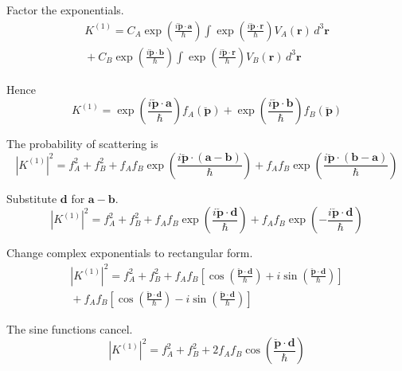 Factor the exponentials.
\begin{multline*}
K^{(1)}
=C_A\exp\left(\frac{i\breve{\mathbf p}\cdot\mathbf a}{\hbar}\right)
\int\exp\left(\frac{i\breve{\mathbf p}\cdot\mathbf r}{\hbar}\right)
V_A(\mathbf r)\,d^3\mathbf r
\\
{}+C_B\exp\left(\frac{i\breve{\mathbf p}\cdot\mathbf b}{\hbar}\right)
\int\exp\left(\frac{i\breve{\mathbf p}\cdot\mathbf r}{\hbar}\right)
V_B(\mathbf r)\,d^3\mathbf r
\end{multline*}

Hence
\begin{equation*}
K^{(1)}=\exp\left(\frac{i\breve{\mathbf p}\cdot\mathbf a}{\hbar}\right)f_A(\breve{\mathbf p})
+\exp\left(\frac{i\breve{\mathbf p}\cdot\mathbf b}{\hbar}\right)f_B(\breve{\mathbf p})
\end{equation*}

The probability of scattering is
\begin{equation*}
\left|K^{(1)}\right|^2=f_A^2+f_B^2
+f_Af_B\exp\left(\frac{i\breve{\mathbf p}\cdot(\mathbf a-\mathbf b)}{\hbar}\right)
+f_Af_B\exp\left(\frac{i\breve{\mathbf p}\cdot(\mathbf b-\mathbf a)}{\hbar}\right)
\end{equation*}

Substitute $\mathbf d$ for $\mathbf a-\mathbf b$.
\begin{equation*}
\left|K^{(1)}\right|^2=f_A^2+f_B^2
+f_Af_B\exp\left(\frac{i\breve{\mathbf p}\cdot\mathbf d}{\hbar}\right)
+f_Af_B\exp\left(-\frac{i\breve{\mathbf p}\cdot\mathbf d}{\hbar}\right)
\end{equation*}

Change complex exponentials to rectangular form.
\begin{multline*}
\left|K^{(1)}\right|^2=f_A^2+f_B^2
+f_Af_B\left[\cos\left(\frac{\breve{\mathbf p}\cdot\mathbf d}{\hbar}\right)
+i\sin\left(\frac{\breve{\mathbf p}\cdot\mathbf d}{\hbar}\right)\right]
\\
{}+f_Af_B\left[\cos\left(\frac{\breve{\mathbf p}\cdot\mathbf d}{\hbar}\right)
-i\sin\left(\frac{\breve{\mathbf p}\cdot\mathbf d}{\hbar}\right)\right]
\end{multline*}

The sine functions cancel.
\begin{equation*}
\left|K^{(1)}\right|^2=f_A^2+f_B^2
+2f_Af_B\cos\left(\frac{\breve{\mathbf p}\cdot\mathbf d}{\hbar}\right)
\end{equation*}



